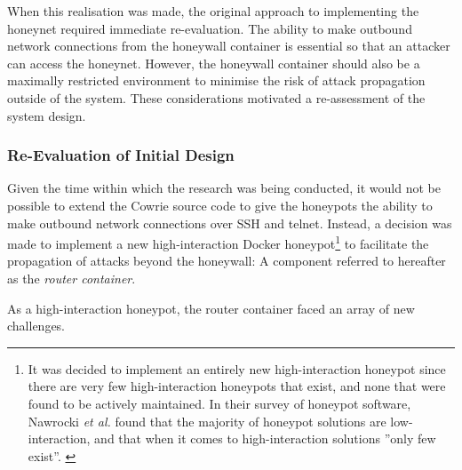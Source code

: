 When this realisation was made, the original approach to implementing the honeynet required immediate re-evaluation. The ability to make outbound network connections from the honeywall container is essential so that an attacker can access the honeynet. However, the honeywall container should also be a maximally restricted environment to minimise the risk of attack propagation outside of the system. These considerations motivated a re-assessment of the system design.

\subsubsection{Re-Evaluation of Initial Design \label{DesignReEvaluation}}
Given the time within which the research was being conducted, it would not be possible to extend the Cowrie source code to give the honeypots the ability to make outbound network connections over SSH and telnet. Instead, a decision was made to implement a new high-interaction Docker honeypot\footnote{It was decided to implement an entirely new high-interaction honeypot since there are very few high-interaction honeypots that exist, and none that were found to be actively maintained. In their survey of honeypot software, Nawrocki \textit{et al.} found that the majority of honeypot solutions are low-interaction, and that when it comes to high-interaction solutions ''only few exist''. \cite{Nawrocki2016}} to facilitate the propagation of attacks beyond the honeywall: A component referred to hereafter as the \textit{router container}. 

As a high-interaction honeypot, the router container faced an array of new challenges.

